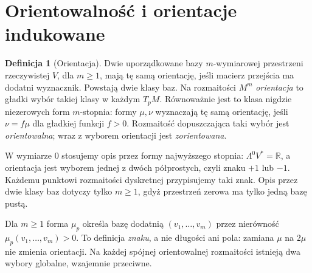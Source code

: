 \documentclass[11pt,a4paper,oneside]{report}
\newcommand{\R}{\mathbb{R}}
\theoremstyle{plain}
\theoremstyle{definition}
\newtheorem{definicja}[twierdzenie]{Definicja}
\theoremstyle{remark}
\begin{document}
\section{Orientowalność i orientacje indukowane}
\label{sec:formy-orientacja}

\begin{definicja}[Orientacja]
\label{def:orientacja-formy}
Dwie uporządkowane bazy $m$-wymiarowej przestrzeni
rzeczywistej $V$, dla $m\geq1$, mają tę samą orientację, jeśli
macierz przejścia ma dodatni wyznacznik.
Powstają dwie klasy baz. Na rozmaitości $M^m$
\emph{orientacja} to gładki wybór takiej klasy w
każdym $T_pM$. Równoważnie jest to klasa
nigdzie niezerowych form $m$-stopnia: formy
$\mu,\nu$ wyznaczają tę samą orientację, jeśli
$\nu=f\mu$ dla gładkiej funkcji $f>0$.
Rozmaitość dopuszczająca taki wybór jest
\emph{orientowalna}; wraz z wyborem orientacji
jest \emph{zorientowana}.
\end{definicja}

W wymiarze $0$ stosujemy opis przez formy najwyższego
stopnia: $\Lambda^0 V^*=\R$, a orientacja jest wyborem
jednej z dwóch półprostych, czyli znaku $+1$ lub $-1$.
Każdemu punktowi rozmaitości dyskretnej przypisujemy taki
znak. Opis przez dwie klasy baz dotyczy tylko $m\geq1$,
gdyż przestrzeń zerowa ma tylko jedną bazę pustą.

Dla $m\geq1$ forma $\mu_p$ określa bazę dodatnią $(v_1,\ldots,v_m)$
przez nierówność $\mu_p(v_1,\ldots,v_m)>0$.
To definicja \emph{znaku}, a nie długości ani pola:
zamiana $\mu$ na $2\mu$ nie zmienia orientacji.
Na każdej spójnej orientowalnej rozmaitości istnieją
dwa wybory globalne, wzajemnie przeciwne.
\end{document}
